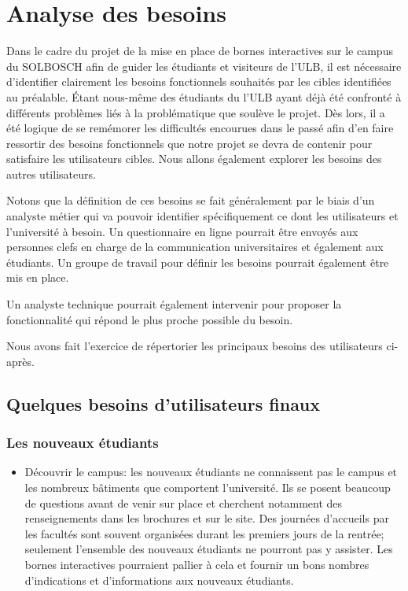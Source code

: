 \chapter{Analyse des besoins}
Dans le cadre du projet de la mise en place de bornes interactives sur le campus du SOLBOSCH afin de guider les étudiants et visiteurs de l’ULB, il est nécessaire d’identifier clairement les besoins fonctionnels souhaités par les cibles identifiées au préalable. Étant nous-même des étudiants du l’ULB ayant déjà été confronté à différents problèmes liés à la problématique que soulève le projet. Dès lors, il a été logique de se remémorer les difficultés encourues dans le passé afin d’en faire ressortir des besoins fonctionnels que notre projet se devra de contenir pour satisfaire les utilisateurs cibles. 
Nous allons également explorer les besoins des autres utilisateurs. 

Notons que la définition de ces besoins se fait généralement par le biais d'un analyste métier qui va pouvoir identifier spécifiquement ce dont les utilisateurs et l'université à besoin. Un questionnaire en ligne pourrait être envoyés aux personnes clefs en charge de la communication universitaires et également aux étudiants. Un groupe de travail pour définir les besoins pourrait également être mis en place.

Un analyste technique pourrait également intervenir pour proposer la fonctionnalité qui répond le plus proche possible du besoin.

Nous avons fait l'exercice de répertorier les principaux besoins des utilisateurs ci-après. 

\section{Quelques besoins d'utilisateurs finaux}
\subsection{Les nouveaux étudiants}

\begin{itemize}
\item Découvrir le campus: les nouveaux étudiants ne connaissent pas le campus et les nombreux bâtiments que comportent l'université. Ils se posent beaucoup de questions avant de venir sur place et cherchent notamment des renseignements dans les brochures et sur le site. Des journées d'accueils par les facultés sont souvent organisées durant les premiers jours de la rentrée; seulement l'ensemble des nouveaux étudiants ne pourront pas y assister. Les bornes interactives pourraient pallier à cela et fournir un bons nombres d'indications et d'informations aux nouveaux étudiants. 

\end{itemize}


